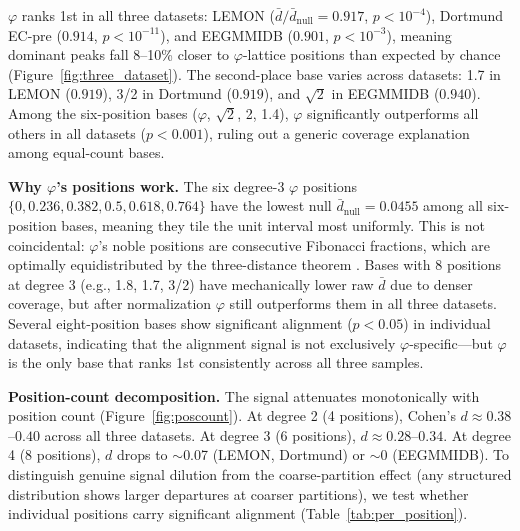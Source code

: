 \documentclass[11pt,a4paper]{article}
\newcommand{\phisym}{\varphi}
\begin{document}
$\phisym$ ranks 1st in all three datasets: LEMON ($\bar{d}/\bar{d}_{\text{null}} = 0.917$, $p < 10^{-4}$), Dortmund EC-pre ($0.914$, $p < 10^{-11}$), and EEGMMIDB ($0.901$, $p < 10^{-3}$), meaning dominant peaks fall 8--10\% closer to $\phisym$-lattice positions than expected by chance (Figure~\ref{fig:three_dataset}). The second-place base varies across datasets: 1.7 in LEMON ($0.919$), 3/2 in Dortmund ($0.919$), and $\sqrt{2}$ in EEGMMIDB ($0.940$). Among the six-position bases ($\phisym$, $\sqrt{2}$, 2, 1.4), $\phisym$ significantly outperforms all others in all datasets ($p < 0.001$), ruling out a generic coverage explanation among equal-count bases.

\textbf{Why $\phisym$'s positions work.} The six degree-3 $\phisym$ positions $\{0, 0.236, 0.382, 0.5, 0.618, 0.764\}$ have the lowest null $\bar{d}_{\text{null}} = 0.0455$ among all six-position bases, meaning they tile the unit interval most uniformly. This is not coincidental: $\phisym$'s noble positions are consecutive Fibonacci fractions, which are optimally equidistributed by the three-distance theorem \parencite{Slater1967}. Bases with 8 positions at degree 3 (e.g., 1.8, 1.7, 3/2) have mechanically lower raw $\bar{d}$ due to denser coverage, but after normalization $\phisym$ still outperforms them in all three datasets. Several eight-position bases show significant alignment ($p < 0.05$) in individual datasets, indicating that the alignment signal is not exclusively $\phisym$-specific---but $\phisym$ is the only base that ranks 1st consistently across all three samples.

\textbf{Position-count decomposition.}
\label{sec:poscount_caveat}
The signal attenuates monotonically with position count (Figure~\ref{fig:poscount}). At degree 2 (4 positions), Cohen's $d \approx 0.38$--$0.40$ across all three datasets. At degree 3 (6 positions), $d \approx 0.28$--$0.34$. At degree 4 (8 positions), $d$ drops to $\sim$0.07 (LEMON, Dortmund) or $\sim$0 (EEGMMIDB). To distinguish genuine signal dilution from the coarse-partition effect (any structured distribution shows larger departures at coarser partitions), we test whether individual positions carry significant alignment (Table~\ref{tab:per_position}).
\end{document}
